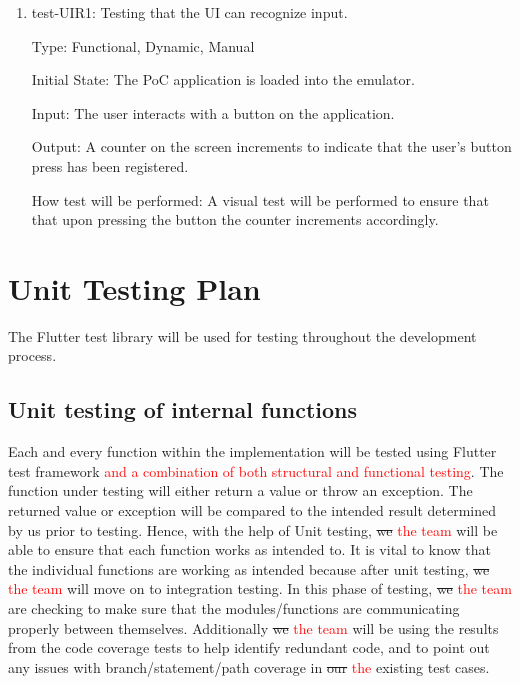 \documentclass[12pt, titlepage]{article}
\begin{document}
\begin{enumerate}

\item test-UIR1: Testing that the UI can recognize input.

Type: Functional, Dynamic, Manual

Initial State: The PoC application is loaded into the emulator. 

Input: The user interacts with a button on the application.

Output: A counter on the screen increments to indicate that the user's button press has been registered. 

How test will be performed: A visual test will be performed to ensure that that upon pressing the button the counter increments accordingly.


\end{enumerate}



				
\section{Unit Testing Plan}
The Flutter test library will be used for testing throughout the development process.

\subsection{Unit testing of internal functions}
Each and every function within the implementation will be tested using Flutter test framework \textcolor{red}{and a combination of both structural and functional testing}. The function under testing will either return a value or throw an exception. The returned value or exception will be compared to the intended result determined by us prior to testing. Hence, with the help of Unit testing, \sout{we} \textcolor{red}{the team} will be able to ensure that each function works as intended to. It is vital to know that the individual functions are working as intended because after unit testing, \sout{we} \textcolor{red}{the team} will move on to integration testing. In this phase of testing, \sout{we} \textcolor{red}{the team} are checking to make sure that the modules/functions are communicating properly between themselves. Additionally \sout{we} \textcolor{red}{the team} will be using the results from the code coverage tests to help identify redundant code, and to point out any issues with branch/statement/path coverage in \sout{our} \textcolor{red}{the} existing test cases.
\end{document}
